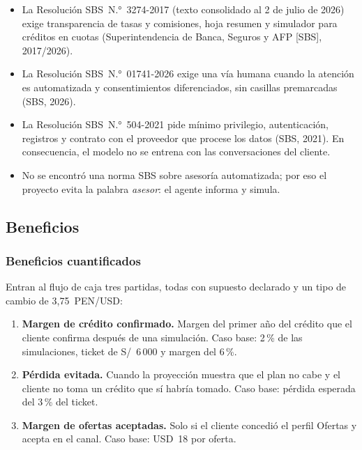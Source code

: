 \documentclass[11pt,a4paper]{article}
\newcommand{\usd}[1]{USD~#1}
\newcommand{\pen}[1]{S/~#1}
\begin{document}
\begin{itemize}
  \item La Resolución SBS~N.°~3274-2017 (texto consolidado al 2 de julio de 2026) exige transparencia de tasas y comisiones, hoja resumen y simulador para créditos en cuotas (Superintendencia de Banca, Seguros y AFP [SBS], 2017/2026).
  \item La Resolución SBS~N.°~01741-2026 exige una vía humana cuando la atención es automatizada y consentimientos diferenciados, sin casillas premarcadas (SBS, 2026).
  \item La Resolución SBS~N.°~504-2021 pide mínimo privilegio, autenticación, registros y contrato con el proveedor que procese los datos (SBS, 2021). En consecuencia, el modelo no se entrena con las conversaciones del cliente.
  \item No se encontró una norma SBS sobre asesoría automatizada; por eso el proyecto evita la palabra \textit{asesor}: el agente informa y simula.
\end{itemize}

\subsection{Beneficios}\label{sec:beneficios}

\subsubsection{Beneficios cuantificados}

Entran al flujo de caja tres partidas, todas con supuesto declarado y un tipo de cambio de 3,75~PEN/USD:

\begin{enumerate}
  \item \textbf{Margen de crédito confirmado.} Margen del primer año del crédito que el cliente confirma después de una simulación. Caso base: 2\,\% de las simulaciones, ticket de \pen{6\,000} y margen del 6\,\%.
  \item \textbf{Pérdida evitada.} Cuando la proyección muestra que el plan no cabe y el cliente no toma un crédito que sí habría tomado. Caso base: pérdida esperada del 3\,\% del ticket.
  \item \textbf{Margen de ofertas aceptadas.} Solo si el cliente concedió el perfil Ofertas y acepta en el canal. Caso base: \usd{18} por oferta.
\end{enumerate}
\end{document}
